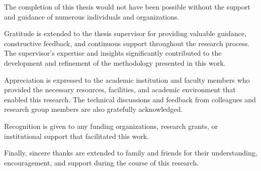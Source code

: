 
The completion of this thesis would not have been possible without the support and guidance of numerous individuals and organizations.

Gratitude is extended to the thesis supervisor for providing valuable guidance, constructive feedback, and continuous support throughout the research process. The supervisor's expertise and insights significantly contributed to the development and refinement of the methodology presented in this work.

Appreciation is expressed to the academic institution and faculty members who provided the necessary resources, facilities, and academic environment that enabled this research. The technical discussions and feedback from colleagues and research group members are also gratefully acknowledged.

Recognition is given to any funding organizations, research grants, or institutional support that facilitated this work.

Finally, sincere thanks are extended to family and friends for their understanding, encouragement, and support during the course of this research.

